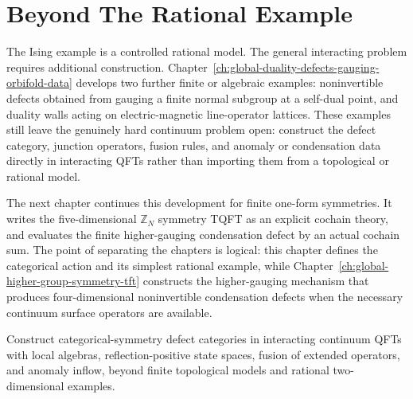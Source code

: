 \section{Beyond The Rational Example}

The Ising example is a controlled rational model.  The general interacting
problem requires additional construction.
Chapter~\ref{ch:global-duality-defects-gauging-orbifold-data}
develops two further finite or algebraic examples: noninvertible defects
obtained from gauging a finite normal subgroup at a self-dual point, and
duality walls acting on electric-magnetic line-operator lattices.  These
examples still leave the genuinely hard continuum problem open: construct the
defect category, junction operators, fusion rules, and anomaly or
condensation data directly in interacting QFTs rather than importing them
from a topological or rational model.

The next chapter continues this development for finite one-form symmetries.
It writes the five-dimensional \(\mathbb Z_N\) symmetry TQFT as an explicit
cochain theory, and evaluates the finite higher-gauging condensation defect by
an actual cochain sum.  The point of separating the chapters is logical: this
chapter defines the categorical action and its simplest rational example,
while Chapter~\ref{ch:global-higher-group-symmetry-tft} constructs the
higher-gauging mechanism that produces four-dimensional noninvertible
condensation defects when the necessary continuum surface operators are
available.

\begin{openproblem}
\label{op:interacting-categorical-symmetries}
Construct categorical-symmetry defect categories in interacting continuum QFTs
with local algebras, reflection-positive state spaces, fusion of extended
operators, and anomaly inflow, beyond finite topological models and rational
two-dimensional examples.
\end{openproblem}

